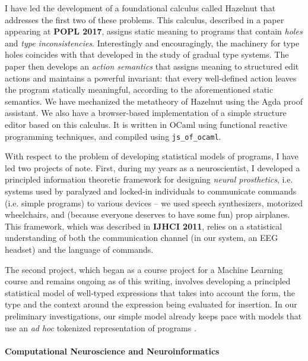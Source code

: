 \documentclass[9pt]{extarticle}
\let\li\lstinline
\begin{document}
I have led the development of a foundational calculus called Hazelnut that addresses the first two of these problems. This calculus, described in a paper appearing at \textbf{POPL 2017}, assigns static meaning to programs that contain \emph{holes} and \emph{type inconsistencies}. Interestingly and encouragingly, the machinery for type holes coincides with that developed in the study of gradual type systems. The paper then develops an \emph{action semantics} that assigns meaning to structured edit actions and maintains a powerful invariant: that every well-defined action leaves the program statically meaningful, according to the aforementioned static semantics. We have mechanized the metatheory of Hazelnut using the Agda proof assistant. We also have a browser-based implementation of a simple {structure editor} based on this calculus. It is written in OCaml using functional reactive programming techniques, and compiled using \li{js_of_ocaml}.

With respect to the problem of developing statistical models of programs, I have led two projects of note. 
First, during my years as a neuroscientist, I developed a principled information theoretic framework for designing \emph{neural prosthetics}, i.e. systems used by paralyzed and locked-in individuals to communicate commands (i.e. simple programs) to various devices -- we used speech synthesizers, motorized wheelchairs, and (because everyone deserves to have some fun) prop airplanes. This framework, which was described in \textbf{IJHCI 2011}, relies on a statistical understanding of both the communication channel (in our system, an EEG headset) and  the language of commands.

The second project, which began as a course project for a Machine Learning course and remains ongoing as of this writing, involves developing a principled statistical model of well-typed expressions that takes into account the form, the type and the context around the expression being evaluated for insertion. In our preliminary investigations, our simple model already keeps pace with models that use an \emph{ad hoc} tokenized representation of programs \cite{icse-naturalness12}.

\vspace{-8px}
\paragraph{Computational Neuroscience and Neuroinformatics}
\end{document}
